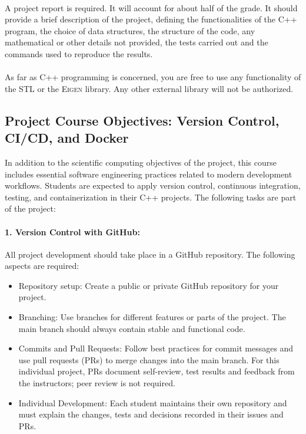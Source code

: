 \documentclass[11pt,a4paper]{article}
\begin{document}
\paragraph{}
A project report is required. It will account for about half of the grade. It should provide a brief description of the project, defining the functionalities of the C++ program,
the choice of data structures, the structure of the code, any mathematical or other details not provided, the tests carried out and the commands used to reproduce the results.

\paragraph{}
As far as C++ programming is concerned, you are free to use any functionality of the STL or the \textsc{Eigen} library. Any other external library will not be authorized.


\subsection{Project Course Objectives: Version Control, CI/CD, and Docker}

In addition to the scientific computing objectives of the project, this course includes essential software engineering practices related to modern development workflows. Students are expected to apply version control, continuous integration, testing, and containerization in their C++ projects. The following tasks are part of the project:

\paragraph{1. Version Control with GitHub:}
All project development should take place in a GitHub repository. The following aspects are required:
\begin{itemize}
\item Repository setup: Create a public or private GitHub repository for your project.
\item Branching: Use branches for different features or parts of the project. The main branch should always contain stable and functional code.
\item Commits and Pull Requests: Follow best practices for commit messages and use pull requests (PRs) to merge changes into the main branch. For this individual project, PRs document self-review, test results and feedback from the instructors; peer review is not required.
\item Individual Development: Each student maintains their own repository and must explain the changes, tests and decisions recorded in their issues and PRs.
\end{itemize}
\end{document}

